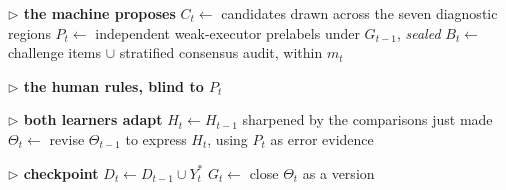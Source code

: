 %
%
\DontPrintSemicolon
\SetAlgoLined
{}

\BlankLine
\textbf{$\rhd$ the machine proposes} \;
$C_t \leftarrow$ candidates drawn across the seven diagnostic regions \;
$P_t \leftarrow$ independent weak-executor prelabels under $G_{t-1}$, \emph{sealed} \;
$B_t \leftarrow$ challenge items $\cup$ stratified consensus audit, within $m_t$ \;

\BlankLine
\textbf{$\rhd$ the human rules, blind to $P_t$} \;

\BlankLine
\textbf{$\rhd$ both learners adapt} \;
$H_t \leftarrow H_{t-1}$ sharpened by the comparisons just made \;
$\Theta_t \leftarrow$ revise $\Theta_{t-1}$ to express $H_t$, using $P_t$ as error evidence \;

\BlankLine
\textbf{$\rhd$ checkpoint} \;
$D_t \leftarrow D_{t-1} \cup Y^{*}_t$ \;
$G_t \leftarrow$ close $\Theta_t$ as a version \;
